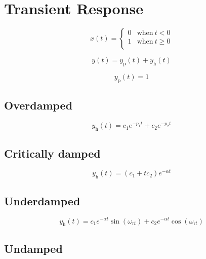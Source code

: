 \documentclass{article}[11pt]
\begin{document}
\section{Transient Response}

\begin{equation}
x(t) =
\begin{cases}
0 & \mathrm{when} \ t < 0    \\
1 & \mathrm{when} \ t \geq 0 \\
\end{cases} 
\end{equation}

\begin{equation}
y(t) = y_{\mathrm{p}}(t) + y_{\mathrm{h}}(t)
\end{equation}

\begin{equation}
 y_{\mathrm{p}}(t) = 1
\end{equation}

\subsection{Overdamped}\label{subsec:step:overdamped}
\begin{equation}
 y_{\mathrm{h}}(t) = c_1 e^{-p_1 t} + c_2 e^{-p_2 t}
\end{equation}

\subsection{Critically damped}\label{subsec:step:critdamped}

\begin{equation}
 y_{\mathrm{h}}(t) = (c_1+t c_2) e^{-\alpha t}
\end{equation}

\subsection{Underdamped}\label{subsec:step:underdamped}

\begin{equation}
 y_{\mathrm{h}}(t) = c_1 e^{-\alpha t} \sin\left(\omega_{\mathrm{r}t}\right) + c_2 e^{-\alpha t} \cos\left(\omega_{\mathrm{r}t}\right)
\end{equation}

\subsection{Undamped}\label{subsec:step:undamped}
\end{document}
